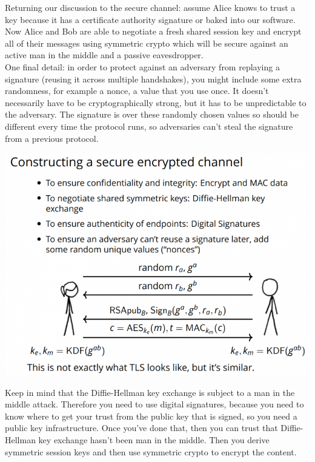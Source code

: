 \documentclass[11pt]{article} %
\begin{document}
{\begin{itemize}
Returning our discussion to the secure channel: assume Alice knows to trust a key because it has a certificate authority signature or baked into our software. Now Alice and Bob are able to negotiate a fresh shared session key and encrypt all of their messages using symmetric crypto which will be secure against an active man in the middle and a passive eavesdropper.\\

{\parindent11pt One final detail: in order to protect against an adversary from replaying a signature (reusing it across multiple handshakes), you might include some extra randomness, for example a nonce, a value that you use once. It doesn't necessarily have to be cryptographically strong, but it has to be unpredictable to 
the adversary. The signature is over these randomly chosen values so should be different every time the protocol runs, so adversaries can't steal the signature from a previous protocol.}

  \includegraphics[scale=0.6]{./Trust-in-keys3.png}

Keep in mind that the Diffie-Hellman key exchange is subject to a man in the middle attack. Therefore you need to use digital signatures, because you need to know where to get your trust from the public key that is signed, so you need a public key infrastructure. Once you've done that, then you can trust that Diffie-Hellman key exchange hasn't been man in the middle. Then you derive symmetric session keys and then use symmetric crypto to encrypt the content.

\end{itemize}

}
\end{document}
